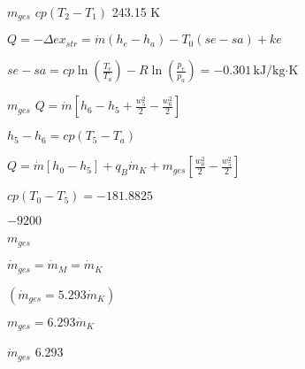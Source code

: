 \( m_{ges} \)  
\( cp(T_2 - T_1) \)  
243.15 K  

\( Q = -\Delta ex_{str} = \dot{m}(h_e - h_a) - T_0(se - sa) + ke \)  

\( se - sa = cp \ln \left( \frac{T_e}{T_a} \right) - R \ln \left( \frac{p_e}{p_a} \right) = -0.301 \, \text{kJ/kg·K} \)  

\( m_{ges} \)  
\( Q = \dot{m} \left[ h_6 - h_5 + \frac{w_5^2}{2} - \frac{w_6^2}{2} \right] \)  

\( h_5 - h_6 = cp(T_5 - T_a) \)  

\( Q = \dot{m} \left[ h_0 - h_5 \right] + q_B \dot{m}_K + m_{ges} \left[ \frac{w_0^2}{2} - \frac{w_5^2}{2} \right] \)  

\( cp(T_0 - T_5) = -181.8825 \)  

\( -9200 \)  

\( m_{ges} \)  

\( \dot{m}_{ges} = \dot{m}_M = \dot{m}_K \)  

\( (\dot{m}_{ges} = 5.293 \dot{m}_K) \)  

\( m_{ges} = 6.293 \dot{m}_K \)  

\( \dot{m}_{ges} \)  
\( 6.293 \)